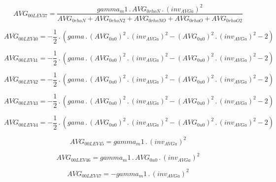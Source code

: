 \documentclass{article}
\begin{document}
\begin{dmath}AVG_{0 0 LEV 37} = \frac{gamma_m1 \,.\, AVG_{0 rhoN} \,.\, \left(inv_{AVG a} \right)^{2}}{AVG_{0 rhoN} + AVG_{0 rhoN2} + AVG_{0 rhoNO} + AVG_{0 rhoO} + AVG_{0 rhoO2}}\end{dmath}

\begin{dmath}AVG_{0 0 LEV 40} = - \frac{1}{2} \,.\, \left(gama \,.\, \left(AVG_{0 u0} \right)^{2} \,.\, \left(inv_{AVG a} \right)^{2} - \left(AVG_{0 u0} \right)^{2} \,.\, \left(inv_{AVG a} \right)^{2} - 2\right)\end{dmath}

\begin{dmath}AVG_{0 0 LEV 41} = - \frac{1}{2} \,.\, \left(gama \,.\, \left(AVG_{0 u0} \right)^{2} \,.\, \left(inv_{AVG a} \right)^{2} - \left(AVG_{0 u0} \right)^{2} \,.\, \left(inv_{AVG a} \right)^{2} - 2\right)\end{dmath}

\begin{dmath}AVG_{0 0 LEV 42} = - \frac{1}{2} \,.\, \left(gama \,.\, \left(AVG_{0 u0} \right)^{2} \,.\, \left(inv_{AVG a} \right)^{2} - \left(AVG_{0 u0} \right)^{2} \,.\, \left(inv_{AVG a} \right)^{2} - 2\right)\end{dmath}

\begin{dmath}AVG_{0 0 LEV 43} = - \frac{1}{2} \,.\, \left(gama \,.\, \left(AVG_{0 u0} \right)^{2} \,.\, \left(inv_{AVG a} \right)^{2} - \left(AVG_{0 u0} \right)^{2} \,.\, \left(inv_{AVG a} \right)^{2} - 2\right)\end{dmath}

\begin{dmath}AVG_{0 0 LEV 44} = - \frac{1}{2} \,.\, \left(gama \,.\, \left(AVG_{0 u0} \right)^{2} \,.\, \left(inv_{AVG a} \right)^{2} - \left(AVG_{0 u0} \right)^{2} \,.\, \left(inv_{AVG a} \right)^{2} - 2\right)\end{dmath}

\begin{dmath}AVG_{0 0 LEV 45} = gamma_m1 \,.\, \left(inv_{AVG a} \right)^{2}\end{dmath}

\begin{dmath}AVG_{0 0 LEV 46} = gamma_m1 \,.\, AVG_{0 u0} \,.\, \left(inv_{AVG a} \right)^{2}\end{dmath}

\begin{dmath}AVG_{0 0 LEV 47} = - gamma_m1 \,.\, \left(inv_{AVG a} \right)^{2}\end{dmath}
\end{document}
